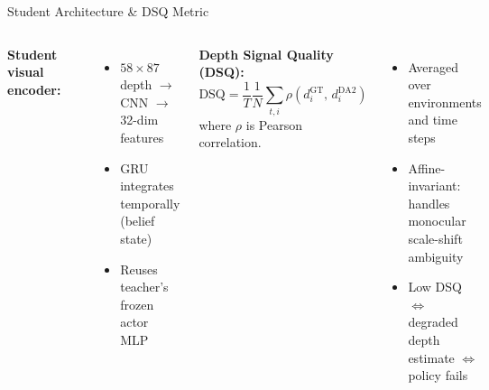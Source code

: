 \documentclass[aspectratio=169,10pt]{beamer}
\begin{document}
\begin{frame}{Student Architecture \& DSQ Metric}
\begin{columns}[T]
  \textbf{Student visual encoder:}
  \vspace{0.2em}
  \begin{center}
    \scalebox{0.78}{%
    }
  \end{center}
  {\small
  \begin{itemize}
    \item $58{\times}87$ depth $\to$ CNN $\to$ 32-dim features
    \item GRU integrates temporally (belief state)
    \item Reuses teacher's frozen actor MLP
  \end{itemize}
  }

  \textbf{Depth Signal Quality (DSQ):}
  \[
    \text{DSQ} = \frac{1}{T}\frac{1}{N}\sum_{t,i}
      \rho\!\left(d^{\text{GT}}_i,\, d^{\text{DA2}}_i\right)
  \]
  where $\rho$ is Pearson correlation.

  \vspace{0.5em}
  \begin{itemize}
    \setlength\itemsep{0.4em}
    \item Averaged over environments and time steps
    \item Affine-invariant: handles monocular scale-shift ambiguity
    \item Low DSQ $\Leftrightarrow$ degraded depth estimate $\Leftrightarrow$ policy fails
  \end{itemize}
\end{columns}
\end{frame}
\end{document}
